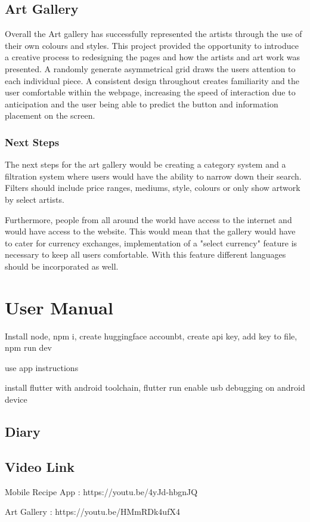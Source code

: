 \documentclass[]{project_final}
\begin{document}
\section{Art Gallery}
Overall the Art gallery has successfully represented the artists through the use of their own colours and styles. This project provided the opportunity to introduce a creative process to redesigning the pages and how the artists and art work was presented. A randomly generate asymmetrical grid draws the users attention to each individual piece.
A consistent design throughout creates familiarity and the user comfortable within the webpage, increasing the speed of interaction due to anticipation and the user being able to predict the button and information placement on the screen.


\subsection{Next Steps}
The next steps for the art gallery would be creating a category system and a filtration system where users would have the ability to narrow down their search. Filters should include price ranges, mediums, style, colours or only show artwork by select artists.

Furthermore, people from all around the world have access to the internet and would have access to the website. This would mean that the gallery would have to cater for currency exchanges, implementation of a "select currency" feature is necessary to keep all users comfortable.
With this feature different languages should be incorporated as well.




\chapter{User Manual}
Install node, npm i, create huggingface accounbt, create api key, add key to file, npm run dev

use app instructions

install flutter with android toolchain, flutter run
enable usb debugging on android device
\section{Diary}
\section{Video Link}

Mobile Recipe App : https://youtu.be/4yJd-hbgnJQ

Art Gallery : https://youtu.be/HMmRDk4ufX4
\end{document}
